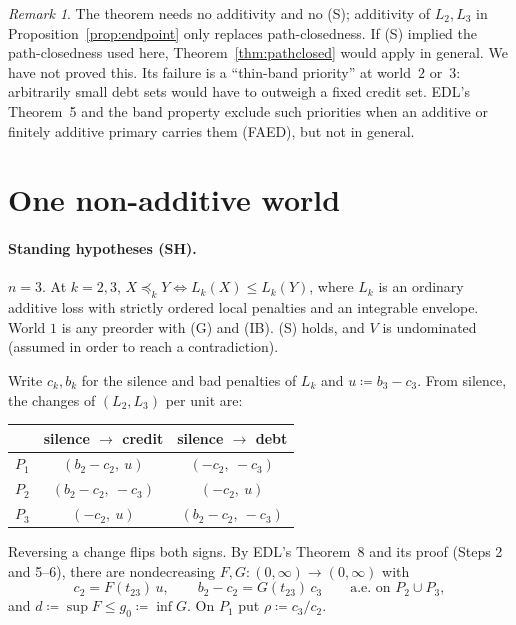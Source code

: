 \documentclass[11pt]{article}
\theoremstyle{definition}\newtheorem{definition}[theorem]{Definition}
\theoremstyle{remark}\newtheorem{remark}[theorem]{Remark}
\begin{document}
\begin{remark}
The theorem needs no additivity and no (S); additivity of $L_2,L_3$ in
Proposition~\ref{prop:endpoint} only replaces path-closedness. If (S) implied
the path-closedness used here, Theorem~\ref{thm:pathclosed} would apply in
general. We have not proved this. Its failure is a ``thin-band priority'' at
world~$2$ or~$3$: arbitrarily small debt sets would have to outweigh a fixed
credit set. EDL's Theorem~5 and the band property exclude such priorities when
an additive or finitely additive primary carries them (FAED), but not in
general.
\end{remark}

\section{One non-additive world}\label{sec:two}

\paragraph{Standing hypotheses (SH).} $n=3$. At $k=2,3$,
$X\preceq_kY\iff L_k(X)\le L_k(Y)$, where $L_k$ is an ordinary additive loss
with strictly ordered local penalties and an integrable envelope. World $1$ is
any preorder with (G) and (IB). (S) holds, and $V$ is undominated (assumed
in order to reach a contradiction).

Write $c_k,b_k$ for the silence and bad penalties of $L_k$ and
$u\coloneqq b_3-c_3$. From silence, the changes of $(L_2,L_3)$ per unit are:
\begin{center}
\begin{tabular}{c|c|c}
 & silence $\to$ credit & silence $\to$ debt\\\hline
$P_1$ & $(b_2-c_2,\ u)$ & $(-c_2,\ -c_3)$\\
$P_2$ & $(b_2-c_2,\ -c_3)$ & $(-c_2,\ u)$\\
$P_3$ & $(-c_2,\ u)$ & $(b_2-c_2,\ -c_3)$
\end{tabular}
\end{center}
Reversing a change flips both signs. By EDL's Theorem~8 and its proof
(Steps 2 and 5--6), there are nondecreasing $F,G:(0,\infty)\to(0,\infty)$ with
\[
 c_2=F(t_{23})\,u,\qquad b_2-c_2=G(t_{23})\,c_3\qquad\text{a.e.\ on }P_2\cup P_3,
\]
and $d\coloneqq\sup F\le g_0\coloneqq\inf G$. On $P_1$ put
$\rho\coloneqq c_3/c_2$.
\end{document}
